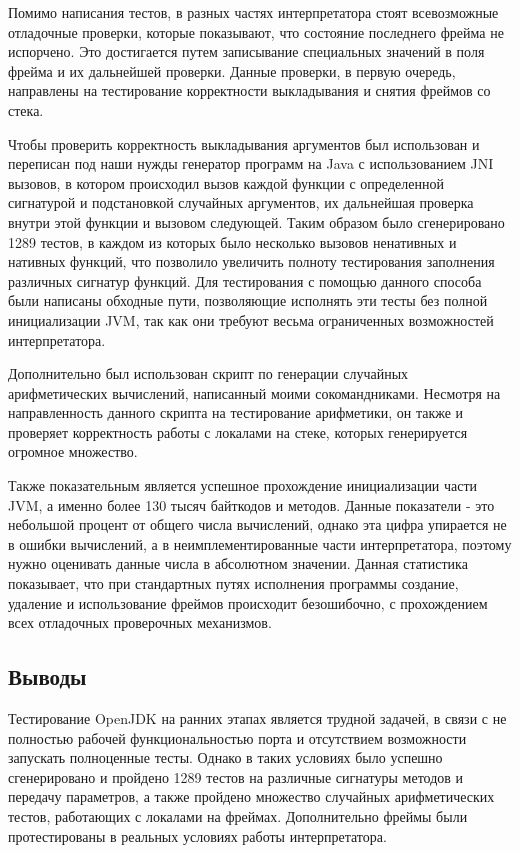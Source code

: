 Помимо написания тестов, в разных частях интерпретатора стоят всевозможные отладочные проверки, которые показывают, что состояние последнего фрейма не испорчено. Это достигается путем записывание специальных значений в поля фрейма и их дальнейшей проверки. Данные проверки, в первую очередь, направлены на тестирование корректности выкладывания и снятия фреймов со стека.

Чтобы проверить корректность выкладывания аргументов был использован и переписан под наши нужды генератор программ на Java с использованием JNI вызовов, в котором происходил вызов каждой функции с определенной сигнатурой и подстановкой случайных аргументов, их дальнейшая проверка внутри этой функции и вызовом следующей. Таким образом было сгенерировано 1289 тестов, в каждом из которых было несколько вызовов ненативных и нативных функций, что позволило увеличить полноту тестирования заполнения различных сигнатур функций. Для тестирования с помощью данного способа были написаны обходные пути, позволяющие исполнять эти тесты без полной инициализации JVM, так как они требуют весьма ограниченных возможностей интерпретатора.

Дополнительно был использован скрипт по генерации случайных арифметических вычислений, написанный моими сокомандниками. Несмотря на направленность данного скрипта на тестирование арифметики, он также и проверяет корректность работы с локалами на стеке, которых генерируется огромное множество.

Также показательным является успешное прохождение инициализации части JVM, а именно более 130 тысяч байткодов и  методов. Данные показатели - это небольшой процент от общего числа вычислений, однако эта цифра упирается не в ошибки вычислений, а в неимплементированные части интерпретатора, поэтому нужно оценивать данные числа в абсолютном значении. Данная статистика показывает, что при стандартных путях исполнения программы создание, удаление и использование фреймов происходит безошибочно, с прохождением всех отладочных проверочных механизмов.



\subsection{Выводы}

Тестирование OpenJDK на ранних этапах является трудной задачей, в связи с не полностью рабочей функциональностью порта и отсутствием возможности запускать полноценные тесты. Однако в таких условиях было успешно сгенерировано и пройдено 1289 тестов на различные сигнатуры методов и передачу параметров, а также пройдено множество случайных арифметических тестов, работающих с локалами на фреймах. Дополнительно фреймы были протестированы в реальных условиях работы интерпретатора.



